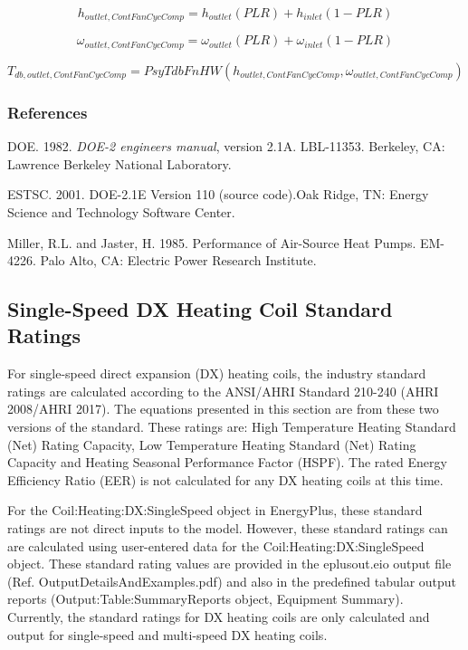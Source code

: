 \begin{equation}
{h_{outlet,ContFanCycComp}} = {h_{outlet}}\left( {PLR} \right) + {h_{inlet}}\left( {1 - PLR} \right)
\end{equation}

\begin{equation}
{\omega_{outlet,ContFanCycComp}} = {\omega_{outlet}}\left( {PLR} \right) + {\omega_{inlet}}\left( {1 - PLR} \right)
\end{equation}

\begin{equation}
{T_{db,outlet,ContFanCycComp}} = PsyTdbFnHW({h_{outlet,ContFanCycComp}},{\omega_{outlet,ContFanCycComp}})
\end{equation}

\subsubsection{References}\label{references-5-001}

DOE. 1982. \emph{DOE-2 engineers manual}, version 2.1A. LBL-11353. Berkeley, CA: Lawrence Berkeley National Laboratory.

ESTSC. 2001. DOE-2.1E Version 110 (source code).Oak Ridge, TN: Energy Science and Technology Software Center.

Miller, R.L. and Jaster, H. 1985. Performance of Air-Source Heat Pumps. EM-4226. Palo Alto, CA: Electric Power Research Institute.

\subsection{Single-Speed DX Heating Coil Standard Ratings}\label{single-speed-dx-heating-coil-standard-ratings}

For single-speed direct expansion (DX) heating coils, the industry standard ratings are calculated according to the ANSI/AHRI Standard 210-240 (AHRI 2008/AHRI 2017).  The equations presented in this section are from these two versions of the standard.  These ratings are: High Temperature Heating Standard (Net) Rating Capacity, Low Temperature Heating Standard (Net) Rating Capacity and Heating Seasonal Performance Factor (HSPF). The rated Energy Efficiency Ratio (EER) is not calculated for any DX heating coils at this time.

For the Coil:Heating:DX:SingleSpeed object in EnergyPlus, these standard ratings are not direct inputs to the model. However, these standard ratings can are calculated using user-entered data for the Coil:Heating:DX:SingleSpeed object. These standard rating values are provided in the eplusout.eio output file (Ref. OutputDetailsAndExamples.pdf) and also in the predefined tabular output reports (Output:Table:SummaryReports object, Equipment Summary). Currently, the standard ratings for DX heating coils are only calculated and output for single-speed and multi-speed DX heating coils.

